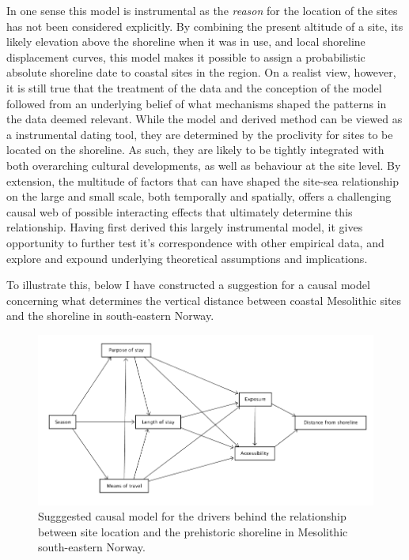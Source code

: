 \documentclass[
  a4paper,
  oneside]{uiophdthesis}
\begin{document}
In one sense this model is instrumental as the \emph{reason} for the location of the sites has not been considered explicitly. By combining the present altitude of a site, its likely elevation above the shoreline when it was in use, and local shoreline displacement curves, this model makes it possible to assign a probabilistic absolute shoreline date to coastal sites in the region. On a realist view, however, it is still true that the treatment of the data and the conception of the model followed from an underlying belief of what mechanisms shaped the patterns in the data deemed relevant. While the model and derived method can be viewed as a instrumental dating tool, they are determined by the proclivity for sites to be located on the shoreline. As such, they are likely to be tightly integrated with both overarching cultural developments, as well as behaviour at the site level. By extension, the multitude of factors that can have shaped the site-sea relationship on the large and small scale, both temporally and spatially, offers a challenging causal web of possible interacting effects that ultimately determine this relationship. Having first derived this largely instrumental model, it gives opportunity to further test it's correspondence with other empirical data, and explore and expound underlying theoretical assumptions and implications.

To illustrate this, below I have constructed a suggestion for a causal model concerning what determines the vertical distance between coastal Mesolithic sites and the shoreline in south-eastern Norway.

\begin{figure}

{\centering \includegraphics[width=1\linewidth]{figures/dagitty_p1} 

}

\caption{Sugggested causal model for the drivers behind the relationship between site location and the prehistoric shoreline in Mesolithic south-eastern Norway.}\label{fig:d1}
\end{figure}
\end{document}
